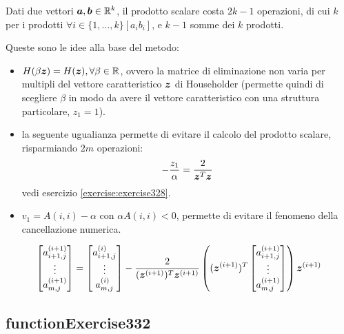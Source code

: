 \begin{oss}
Dati due vettori $\boldsymbol{a}, \boldsymbol{b} \in \mathbb{R}^{k}$, il prodotto scalare
costa $2k - 1$ operazioni, di cui $k$ per i prodotti $\forall i \in
\{1, \ldots , k \} [a_{i}b_{i}]$, e $k-1$ somme dei $k$ prodotti.
\end{oss}

\begin{oss}
Queste sono le idee alla base del metodo:
\begin{itemize}
  \item $H(\beta \boldsymbol{z}) = H(\boldsymbol{z}), \forall \beta \in \mathbb{R}$, ovvero
  la matrice di eliminazione non varia per multipli del vettore caratteristico
  $\boldsymbol{z}$ di Householder (permette quindi di scegliere $\beta$ in modo
  da avere il vettore caratteristico con una struttura particolare, $z_{1} =
  1$).
  
  \item la seguente ugualianza permette di evitare il calcolo del prodotto
  scalare, risparmiando $2m$ operazioni:
  	\begin{displaymath}
  		-\frac{z_{1}}{\alpha} =
  		\frac{2}{\boldsymbol{z}^{T}\boldsymbol{z}}
  	\end{displaymath}
  vedi esercizio \ref{exercise:exercise328}.
  
  \item $v_{1} = A(i, i) - \alpha$ con $\alpha A(i, i) < 0$, permette di
  evitare il fenomeno della cancellazione numerica.
\end{itemize}
\end{oss}

\begin{oss}

\end{oss}

\begin{oss}
\begin{displaymath}
\begin{bmatrix}
a_{i+1, j}^{(i+1)} \\
\vdots \\
a_{m, j}^{(i+1)}
\end{bmatrix} = 
\begin{bmatrix}
a_{i+1, j}^{(i)} \\
\vdots \\
a_{m, j}^{(i)}
\end{bmatrix} - \frac{2}{(\vect{z}^{(i+1)})^{T} \vect{z}^{(i+1)}} %
\left ( (\vect{z}^{(i+1)})^{T} \begin{bmatrix}
a_{i+1, j}^{(i+1)} \\
\vdots \\
a_{m, j}^{(i+1)} 
\end{bmatrix} \right )\vect{z}^{(i+1)}
\end{displaymath}
\end{oss}



\subsection{functionExercise332}
\label{subsection:functionExercise332}
